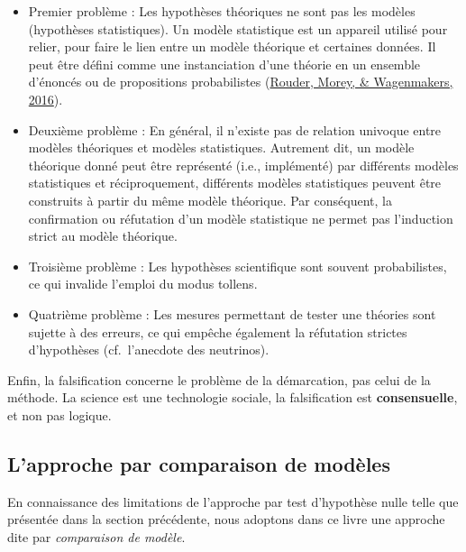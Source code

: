 \documentclass[
  a4paper,11pt,twoside,onecolumn,openright,final,oldfontcommands]{memoir}
\theoremstyle{definition}
\theoremstyle{definition}
\theoremstyle{definition}
\theoremstyle{remark}
\begin{document}
\begin{itemize}
\item
  Premier problème : Les hypothèses théoriques ne sont pas les modèles (hypothèses statistiques). Un modèle statistique est un appareil utilisé pour relier, pour faire le lien entre un modèle théorique et certaines données. Il peut être défini comme une instanciation d'une théorie en un ensemble d'énoncés ou de propositions probabilistes (\protect\hyperlink{ref-rouder_interplay_2016}{Rouder, Morey, \& Wagenmakers, 2016}).
\item
  Deuxième problème : En général, il n'existe pas de relation univoque entre modèles théoriques et modèles statistiques. Autrement dit, un modèle théorique donné peut être représenté (i.e., implémenté) par différents modèles statistiques et réciproquement, différents modèles statistiques peuvent être construits à partir du même modèle théorique. Par conséquent, la confirmation ou réfutation d'un modèle statistique ne permet pas l'induction strict au modèle théorique.
\item
  Troisième problème : Les hypothèses scientifique sont souvent probabilistes, ce qui invalide l'emploi du modus tollens.
\item
  Quatrième problème : Les mesures permettant de tester une théories sont sujette à des erreurs, ce qui empêche également la réfutation strictes d'hypothèses (cf.~l'anecdote des neutrinos).
\end{itemize}

Enfin, la falsification concerne le problème de la démarcation, pas celui de la méthode. La science est une technologie sociale, la falsification est \textbf{consensuelle}, et non pas logique.

\hypertarget{lapproche-par-comparaison-de-moduxe8les}{%
\subsection{L'approche par comparaison de modèles}\label{lapproche-par-comparaison-de-moduxe8les}}

En connaissance des limitations de l'approche par test d'hypothèse nulle telle que présentée dans la section précédente, nous adoptons dans ce livre une approche dite par \emph{comparaison de modèle}.
\end{document}
